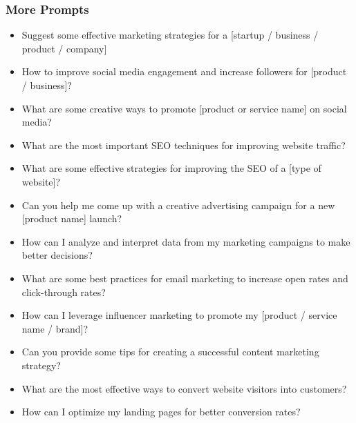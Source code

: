 \begin{frame}[fragile]\frametitle{More Prompts}
\begin{itemize}
\item Suggest some effective marketing strategies for a [startup / business / product / company]
\item How to improve social media engagement and increase followers for [product / business]?
\item What are some creative ways to promote [product or service name] on social media?
\item What are the most important SEO techniques for improving website traffic?
\item What are some effective strategies for improving the SEO of a [type of website]?
\item Can you help me come up with a creative advertising campaign for a new [product name] launch?
\item How can I analyze and interpret data from my marketing campaigns to make better decisions?
\item What are some best practices for email marketing to increase open rates and click-through rates?
\item How can I leverage influencer marketing to promote my [product / service name / brand]?
\item Can you provide some tips for creating a successful content marketing strategy?
\item What are the most effective ways to convert website visitors into customers?
\item How can I optimize my landing pages for better conversion rates?
\end{itemize}
\end{frame}

